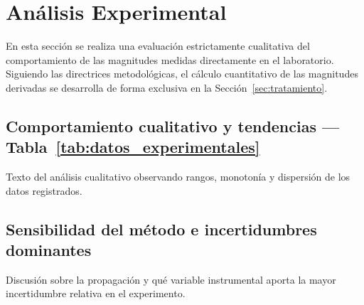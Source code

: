
\section{Análisis Experimental}
\label{sec:analisis_exp}

En esta sección se realiza una evaluación estrictamente cualitativa del comportamiento de las magnitudes medidas directamente en el laboratorio. Siguiendo las directrices metodológicas, el cálculo cuantitativo de las magnitudes derivadas se desarrolla de forma exclusiva en la Sección~\ref{sec:tratamiento}.

\subsection{Comportamiento cualitativo y tendencias --- Tabla~\ref{tab:datos_experimentales}}

Texto del análisis cualitativo observando rangos, monotonía y dispersión de los datos registrados.

\subsection{Sensibilidad del método e incertidumbres dominantes}

Discusión sobre la propagación y qué variable instrumental aporta la mayor incertidumbre relativa en el experimento.
